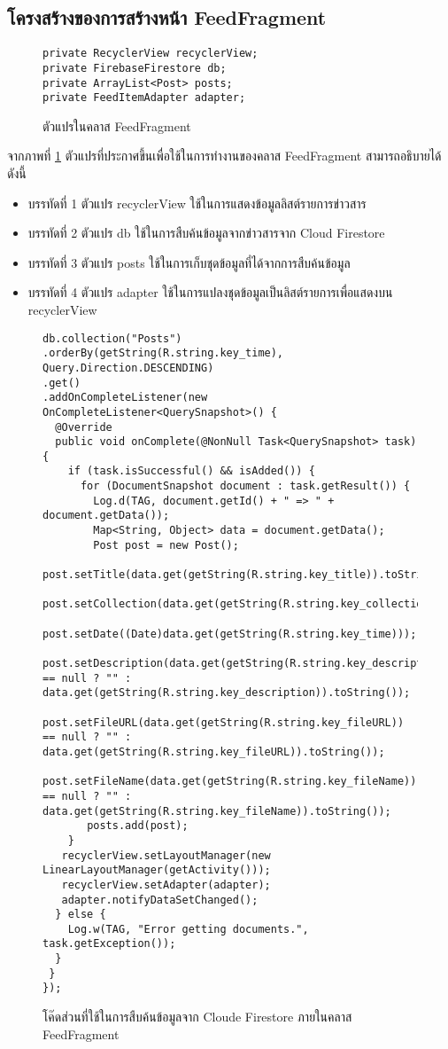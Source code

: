 	\subsection{โครงสร้างของการสร้างหน้า FeedFragment}
	\begin{figure}[H]
		{\begin{lstlisting}
private RecyclerView recyclerView;
private FirebaseFirestore db;
private ArrayList<Post> posts;
private FeedItemAdapter adapter;
			\end{lstlisting}}
		\caption{ตัวแปรในคลาส FeedFragment}
		\label{Fig:FeedFragment}
	\end{figure}
	จากภาพที่ \ref{Fig:FeedFragment} ตัวแปรที่ประกาศขึ้นเพื่อใช้ในการทำงานของคลาส FeedFragment สามารถอธิบายได้ดังนี้
	\begin{itemize}[label={--}]
		\item บรรทัดที่ 1 ตัวแปร recyclerView ใช้ในการแสดงข้อมูลลิสต์รายการข่าวสาร
		\item บรรทัดที่ 2 ตัวแปร db ใช้ในการสืบค้นข้อมูลจากข่าวสารจาก Cloud Firestore 
		\item บรรทัดที่ 3 ตัวแปร posts ใช้ในการเก็บชุดข้อมูลที่ได้จากการสืบค้นข้อมูล
		\item บรรทัดที่ 4 ตัวแปร adapter ใช้ในการแปลงชุดข้อมูลเป็นลิสต์รายการเพื่อแสดงบน recyclerView
	\end{itemize}
	\begin{figure}[H]
		{\begin{lstlisting}
db.collection("Posts")
.orderBy(getString(R.string.key_time), Query.Direction.DESCENDING)
.get()
.addOnCompleteListener(new OnCompleteListener<QuerySnapshot>() {
  @Override
  public void onComplete(@NonNull Task<QuerySnapshot> task) {
    if (task.isSuccessful() && isAdded()) {
      for (DocumentSnapshot document : task.getResult()) {
        Log.d(TAG, document.getId() + " => " + document.getData());
        Map<String, Object> data = document.getData();
        Post post = new Post();
        post.setTitle(data.get(getString(R.string.key_title)).toString());
        post.setCollection(data.get(getString(R.string.key_collection)).toString());
        post.setDate((Date)data.get(getString(R.string.key_time)));
        post.setDescription(data.get(getString(R.string.key_description)) == null ? "" : data.get(getString(R.string.key_description)).toString());
        post.setFileURL(data.get(getString(R.string.key_fileURL)) == null ? "" : data.get(getString(R.string.key_fileURL)).toString());
        post.setFileName(data.get(getString(R.string.key_fileName)) == null ? "" : data.get(getString(R.string.key_fileName)).toString());
       posts.add(post);
    }
   recyclerView.setLayoutManager(new LinearLayoutManager(getActivity()));
   recyclerView.setAdapter(adapter);
   adapter.notifyDataSetChanged();
  } else {
    Log.w(TAG, "Error getting documents.", task.getException());
  }
 }
});
			\end{lstlisting}}
		\caption{โค๊ดส่วนที่ใช้ในการสืบค้นข้อมูลจาก Cloude Firestore ภายในคลาส FeedFragment}
		\label{Fig:FeedFragment2}
	\end{figure}
